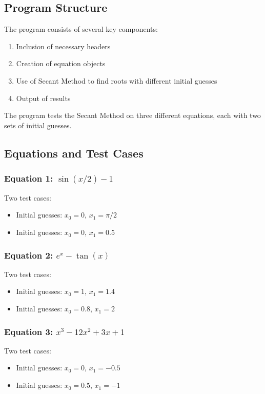 \documentclass{article}
\begin{document}
\subsection{Program Structure}
The program consists of several key components:
\begin{enumerate}
\item Inclusion of necessary headers
\item Creation of equation objects
\item Use of Secant Method to find roots with different initial guesses
\item Output of results
\end{enumerate}
The program tests the Secant Method on three different equations, each with two sets of initial guesses.
\subsection{Equations and Test Cases}
\subsubsection{Equation 1: $\sin(x/2) - 1$}
Two test cases:
\begin{itemize}
\item Initial guesses: $x_0 = 0$, $x_1 = \pi/2$
\item Initial guesses: $x_0 = 0$, $x_1 = 0.5$
\end{itemize}
\subsubsection{Equation 2: $e^x - \tan(x)$}
Two test cases:
\begin{itemize}
\item Initial guesses: $x_0 = 1$, $x_1 = 1.4$
\item Initial guesses: $x_0 = 0.8$, $x_1 = 2$
\end{itemize}
\subsubsection{Equation 3: $x^3 - 12x^2 + 3x + 1$}
Two test cases:
\begin{itemize}
\item Initial guesses: $x_0 = 0$, $x_1 = -0.5$
\item Initial guesses: $x_0 = 0.5$, $x_1 = -1$
\end{itemize}
\end{document}
